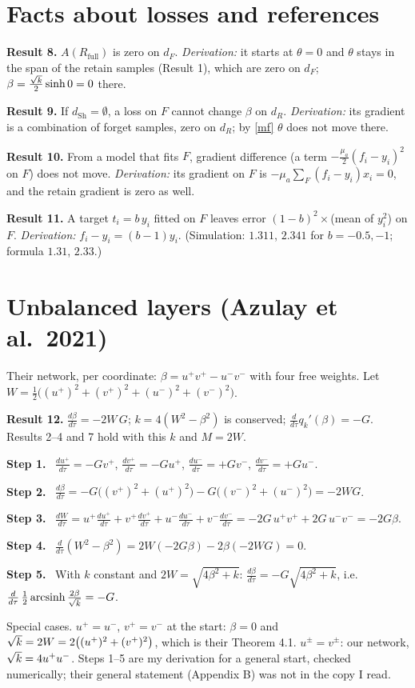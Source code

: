 \documentclass[10pt]{article}
\newcommand{\Rf}{R_{\mathrm{full}}}\newcommand{\Ff}{F_{\mathrm{full}}}\newcommand{\dSh}{d_{\mathrm{Sh}}}
\newcommand{\step}[1]{\par\smallskip\textbf{Step #1.}\ }
\begin{document}
\section{Facts about losses and references}\label{sec:facts}
\textbf{Result 8.} $A(\Rf)$ is zero on $d_F$. \emph{Derivation:} it starts at $\theta=0$ and $\theta$ stays in the span of the retain samples (Result 1), which are zero on $d_F$; $\beta=\frac{\sqrt k}2\sinh0=0$ there.

\textbf{Result 9.} If $\dSh=\emptyset$, a loss on $F$ cannot change $\beta$ on $d_R$. \emph{Derivation:} its gradient is a combination of forget samples, zero on $d_R$; by \eqref{mf} $\theta$ does not move there.

\textbf{Result 10.} From a model that fits $F$, gradient difference (a term $-\frac{\mu_a}2(f_i-y_i)^2$ on $F$) does not move. \emph{Derivation:} its gradient on $F$ is $-\mu_a\sum_F(f_i-y_i)x_i=0$, and the retain gradient is zero as well.

\textbf{Result 11.} A target $t_i=b\,y_i$ fitted on $F$ leaves error $(1-b)^2\times$(mean of $y_i^2$) on $F$. \emph{Derivation:} $f_i-y_i=(b-1)y_i$. (Simulation: $1.311$, $2.341$ for $b=-0.5,-1$; formula $1.31$, $2.33$.)

\section{Unbalanced layers (Azulay et al.\ 2021)}\label{sec:unbal}
Their network, per coordinate: $\beta=u^+v^+-u^-v^-$ with four free weights. Let $W=\frac12\big((u^+)^2+(v^+)^2+(u^-)^2+(v^-)^2\big)$.

\textbf{Result 12.} $\frac{d\beta}{d\tau}=-2W\,G$; $k=4(W^2-\beta^2)$ is conserved; $\frac d{d\tau}q_k'(\beta)=-G$. Results 2--4 and 7 hold with this $k$ and $M=2W$.
\step1 $\frac{du^+}{d\tau}=-Gv^+$, $\frac{dv^+}{d\tau}=-Gu^+$, $\frac{du^-}{d\tau}=+Gv^-$, $\frac{dv^-}{d\tau}=+Gu^-$.
\step2 $\frac{d\beta}{d\tau}=-G\big((v^+)^2+(u^+)^2\big)-G\big((v^-)^2+(u^-)^2\big)=-2WG$.
\step3 $\frac{dW}{d\tau}=u^+\frac{du^+}{d\tau}+v^+\frac{dv^+}{d\tau}+u^-\frac{du^-}{d\tau}+v^-\frac{dv^-}{d\tau}=-2G\,u^+v^++2G\,u^-v^-=-2G\beta$.
\step4 $\frac d{d\tau}(W^2-\beta^2)=2W(-2G\beta)-2\beta(-2WG)=0$.
\step5 With $k$ constant and $2W=\sqrt{4\beta^2+k}$: $\frac{d\beta}{d\tau}=-G\sqrt{4\beta^2+k}$, i.e.\ $\frac d{d\tau}\,\frac12\operatorname{arcsinh}\frac{2\beta}{\sqrt k}=-G$.

Special cases. $u^+=u^-$, $v^+=v^-$ at the start: $\beta=0$ and $\sqrt k=2W=2\big((u^+)^2+(v^+)^2\big)$, which is their Theorem 4.1. $u^\pm=v^\pm$: our network, $\sqrt k=4u^+u^-$. Steps 1--5 are my derivation for a general start, checked numerically; their general statement (Appendix B) was not in the copy I read.
\end{document}
